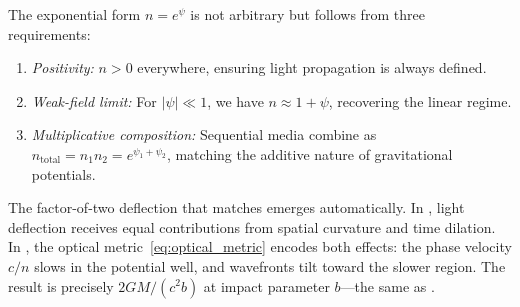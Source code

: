 The exponential form $n = e^\psi$ is not arbitrary but follows from three 
requirements:
\begin{enumerate}[label=(\roman*)]
\item \emph{Positivity:} $n > 0$ everywhere, ensuring light propagation is 
always defined.
\item \emph{Weak-field limit:} For $|\psi| \ll 1$, we have 
$n \approx 1 + \psi$, recovering the linear regime.
\item \emph{Multiplicative composition:} Sequential media combine as 
$n_{\text{total}} = n_1 n_2 = e^{\psi_1 + \psi_2}$, matching the additive 
nature of gravitational potentials.
\end{enumerate}

The factor-of-two deflection that matches \GR emerges automatically. 
In \GR, light deflection receives equal contributions from spatial curvature 
and time dilation. In \DFD, the optical metric~\eqref{eq:optical_metric} 
encodes both effects: the phase velocity $c/n$ slows in the potential well, 
and wavefronts tilt toward the slower region. The result is precisely 
$2GM/(c^2 b)$ at impact parameter $b$---the same as \GR.


